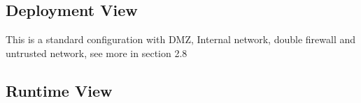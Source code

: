 \documentclass{article}
\begin{document}
\subsection{Deployment View}
\begin{figure}[H]
\end{figure}
		This is a standard configuration with DMZ, Internal network, double firewall and untrusted network, see more in section 2.8
\subsection{Runtime View}
\end{document}
